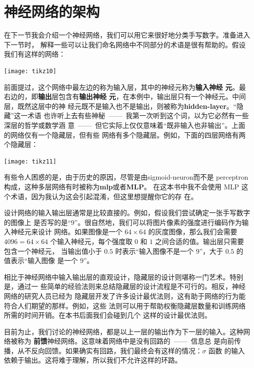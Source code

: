 \section{神经网络的架构}

在下一节我会介绍一个神经网络，我们可以用它来很好地分类手写数字。准备进入下一节时，
解释一些可以让我们命名网络中不同部分的术语是很有帮助的。假设我们有这样的网络：
\begin{center}
  \texttt{[image: tikz10]}
\end{center}

前面提过，这个网络中最左边的称为输入层，其中的神经元称为\textbf{输入神经
  元}。最右边的，即\textbf{输出}层包含有\textbf{输出神经
  元}，在本例中，输出层只有一个神经元。中间层，既然这层中的神
经元既不是输入也不是输出，则被称为\textbf{\gls{hidden-layer}}。“隐藏”这一术语
也许听上去有些神秘~——~我第一次听到这个词，以为它必然有一些深层的哲学或数学涵
意~——~但它实际上仅仅意味着“既非输入也非输出”。上面的网络仅有一个隐藏层，但有些
网络有多个隐藏层。例如，下面的四层网络有两个隐藏层：
\begin{center}
  \texttt{[image: tikz11]}
\end{center}

有些令人困惑的是，由于历史的原因，尽管是由\gls*{sigmoid-neuron}而不是%
\gls*{perceptron}构成，这种多层网络有时被称为\textbf{\gls{mlp}}或者\textbf{MLP}。
在这本书中我不会使用 MLP 这个术语，因为我认为这会引起混淆，但这里想提醒你它的存
在。

设计网络的输入输出层通常是比较直接的。例如，假设我们尝试确定一张手写数字的图像上
是否写的是“9”。很自然地，我们可以将图片像素的强度进行编码作为输入神经元来设计
网络。如果图像是一个 $64 \times 64$ 的灰度图像，那么我们会需要 $4096 = 64 \times
64$ 个输入神经元，每个强度取 $0$ 和 $1$ 之间合适的值。输出层只需要包含一个神经元，
当输出值小于 $0.5$ 时表示“输入图像不是一个 $9$”，大于 $0.5$ 的值表示“输入图像
是一个 $9$”。

相比于神经网络中输入输出层的直观设计，隐藏层的设计则堪称一门艺术。特别是，通过一
些简单的经验法则来总结隐藏层的设计流程是不可行的。相反，神经网络的研究人员已经为
隐藏层开发了许多设计最优法则，这有助于网络的行为能符合人们期望的那样。例如，这些
法则可以用于帮助权衡隐藏层数量和训练网络所需的时间开销。在本书后面我们会碰到几个
这样的设计最优法则。

目前为止，我们讨论的神经网络，都是以上一层的输出作为下一层的输入。这种网络被称为
\textbf{前馈}神经网络。这意味着网络中是没有回路的~——~信息总
是向前传播，从不反向回馈。如果确实有回路，我们最终会有这样的情况：$\sigma$ 函数
的输入依赖于输出。这将难于理解，所以我们不允许这样的环路。

